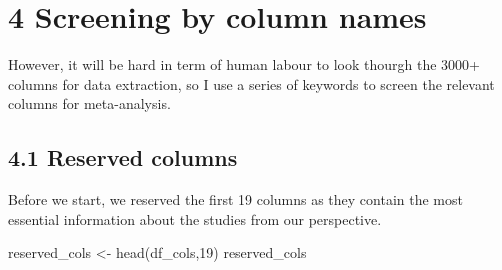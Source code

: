 \documentclass[
]{article}
\newenvironment{Shaded}{\begin{snugshade}}{\end{snugshade}}
\newcommand{\DecValTok}[1]{\textcolor[rgb]{0.00,0.00,0.81}{#1}}
\newcommand{\FunctionTok}[1]{\textcolor[rgb]{0.00,0.00,0.00}{#1}}
\newcommand{\NormalTok}[1]{#1}
\newcommand{\OtherTok}[1]{\textcolor[rgb]{0.56,0.35,0.01}{#1}}
\begin{document}
\hypertarget{screening-by-column-names}{%
\section{4 Screening by column names}\label{screening-by-column-names}}

However, it will be hard in term of human labour to look thourgh the
3000+ columns for data extraction, so I use a series of keywords to
screen the relevant columns for meta-analysis.

\hypertarget{reserved-columns}{%
\subsection{4.1 Reserved columns}\label{reserved-columns}}

Before we start, we reserved the first 19 columns as they contain the
most essential information about the studies from our perspective.

\begin{Shaded}
\begin{Highlighting}[]
\NormalTok{reserved\_cols }\OtherTok{\textless{}{-}} \FunctionTok{head}\NormalTok{(df\_cols,}\DecValTok{19}\NormalTok{)}
\NormalTok{reserved\_cols}
\end{Highlighting}
\end{Shaded}
\end{document}
